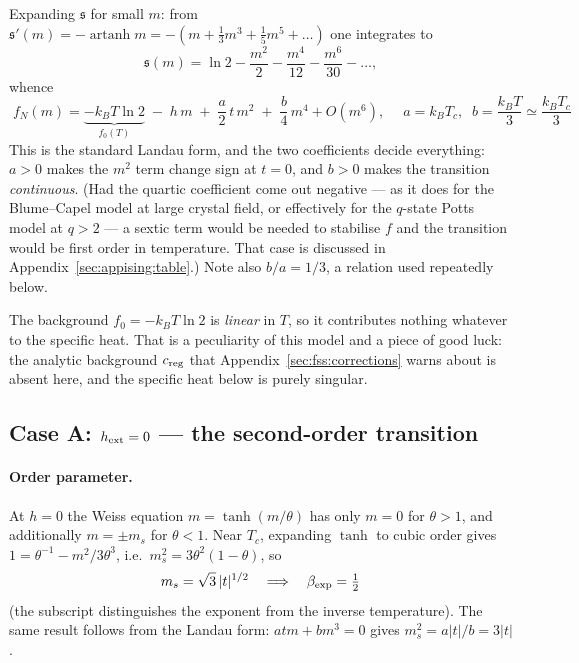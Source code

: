 \documentclass[10pt,a4paper]{article}
\theoremstyle{remark}
\begin{document}
Expanding $\mathfrak{s}$ for small $m$: from
$\mathfrak{s}'(m)=-\operatorname{artanh}m=-(m+\tfrac13m^{3}+\tfrac15m^{5}+\dots)$
one integrates to
\[
\mathfrak{s}(m)=\ln2-\frac{m^{2}}{2}-\frac{m^{4}}{12}-\frac{m^{6}}{30}-\dots ,
\]
whence
\[
\;
f_N(m)=\underbrace{-k_BT\ln2}_{f_0(T)}
\;-\;h\,m\;+\;\frac{a}{2}\,t\,m^{2}\;+\;\frac{b}{4}\,m^{4}+O(m^{6}),
\quad\;
a=k_BT_c,\;\; b=\frac{k_BT}{3}\simeq\frac{k_BT_c}{3}\
\]
This is the standard Landau form, and the two coefficients decide everything:
$a>0$ makes the $m^{2}$ term change sign at $t=0$, and $b>0$ makes the transition
\emph{continuous}. (Had the quartic coefficient come out negative --- as it does
for the Blume--Capel model at large crystal field, or effectively for the
$q$-state Potts model at $q>2$ --- a sextic term would be needed to stabilise $f$
and the transition would be first order in temperature. That case is discussed in
Appendix~\ref{sec:appising:table}.) Note also $b/a=1/3$, a relation used
repeatedly below.

The background $f_0=-k_BT\ln2$ is \emph{linear} in $T$, so it contributes nothing
whatever to the specific heat. That is a peculiarity of this model and a piece of
good luck: the analytic background $c_{\rm reg}$ that Appendix~\ref{sec:fss:corrections}
warns about is absent here, and the specific heat below is purely singular.

\subsection{Case A: $h_{\rm ext}=0$ --- the second-order transition}
\label{sec:appising:caseA}

\paragraph{Order parameter.} At $h=0$ the Weiss equation $m=\tanh(m/\theta)$ has
only $m=0$ for $\theta>1$, and additionally $m=\pm m_s$ for $\theta<1$. Near
$T_c$, expanding $\tanh$ to cubic order gives $1=\theta^{-1}-m^{2}/3\theta^{3}$,
i.e.\ $m_s^{2}=3\theta^{2}(1-\theta)$, so
\[
\;m_s=\sqrt{3}\,|t|^{1/2}\quad\Longrightarrow\quad\beta_{\rm exp}=\tfrac12\
\]
(the subscript distinguishes the exponent from the inverse temperature). The same
result follows from the Landau form: $atm+bm^{3}=0$ gives
$m_s^{2}=a|t|/b=3|t|$.
\end{document}

